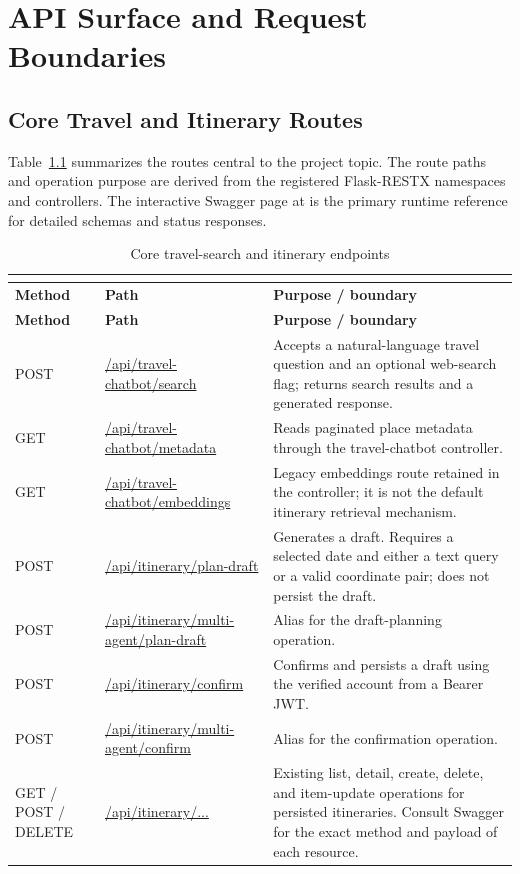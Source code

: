 \chapter{API Surface and Request Boundaries}
\label{app:api}

\section{Core Travel and Itinerary Routes}

Table~\ref{tab:core_api} summarizes the routes central to the project topic. The route paths and operation purpose are derived from the registered Flask-RESTX namespaces and controllers. The interactive Swagger page at  is the primary runtime reference for detailed schemas and status responses.

\begin{longtable}{>{\raggedright\arraybackslash}p{2.3cm} >{\raggedright\arraybackslash}p{5.0cm} >{\raggedright\arraybackslash}p{6.0cm}}
\caption{Core travel-search and itinerary endpoints}\\
\label{tab:core_api}\\
\toprule
\textbf{Method} & \textbf{Path} & \textbf{Purpose / boundary} \\
\midrule
\endfirsthead
\toprule
\textbf{Method} & \textbf{Path} & \textbf{Purpose / boundary} \\
\midrule
\endhead
POST & \url{/api/travel-chatbot/search} & Accepts a natural-language travel question and an optional web-search flag; returns search results and a generated response. \\
GET & \url{/api/travel-chatbot/metadata} & Reads paginated place metadata through the travel-chatbot controller. \\
GET & \url{/api/travel-chatbot/embeddings} & Legacy embeddings route retained in the controller; it is not the default itinerary retrieval mechanism. \\
POST & \url{/api/itinerary/plan-draft} & Generates a draft. Requires a selected date and either a text query or a valid coordinate pair; does not persist the draft. \\
POST & \url{/api/itinerary/multi-agent/plan-draft} & Alias for the draft-planning operation. \\
POST & \url{/api/itinerary/confirm} & Confirms and persists a draft using the verified account from a Bearer JWT. \\
POST & \url{/api/itinerary/multi-agent/confirm} & Alias for the confirmation operation. \\
GET / POST / DELETE & \url{/api/itinerary/...} & Existing list, detail, create, delete, and item-update operations for persisted itineraries. Consult Swagger for the exact method and payload of each resource. \\
\bottomrule
\end{longtable}

